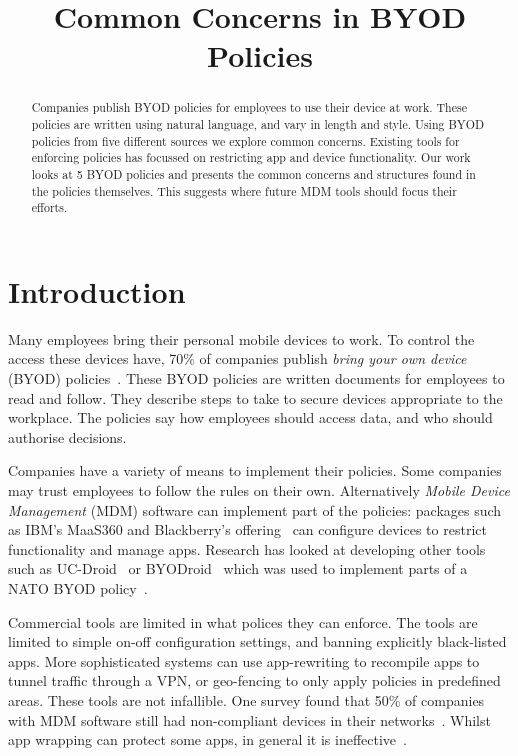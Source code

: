 \documentclass[conference,twocolumn]{IEEEtran}
\title{Common Concerns in BYOD Policies}
\author{%
  \IEEEauthorblockN{Joseph Hallett}
  \IEEEauthorblockA{University of Edinburgh}
  \and
  \IEEEauthorblockN{David Aspinall}
  \IEEEauthorblockA{University of Edinburgh}
}
\begin{document}
\maketitle

\begin{abstract}
  Companies publish BYOD policies for employees to use their device at work.
  These policies are written using natural language, and vary in length and style.
  Using BYOD policies from five different sources we explore common concerns.
  Existing tools for enforcing policies has focussed on restricting app and device functionality.
  Our work looks at 5 BYOD policies and presents the common concerns and structures found in the policies themselves.
  This suggests where future MDM tools should focus their efforts.
\end{abstract}

\section{Introduction}
\label{sec:introduction}

Many employees bring their personal mobile devices to work.
To control the access these devices have, 70\% of companies publish \emph{bring your own device} (BYOD) policies~\cite{schulze_byod_2016}.
These BYOD policies are written documents for employees to read and follow.
They describe steps to take to secure devices appropriate to the workplace.
The policies say how employees should access data, and who should authorise decisions.

Companies have a variety of means to implement their policies.
Some companies may trust employees to follow the rules on their own.
Alternatively \emph{Mobile Device Management} (MDM) software can implement part of the policies: packages such as IBM's MaaS360 and Blackberry's offering~\cite{_ibm_????,_secure_????} can configure devices to restrict functionality and manage apps.
Research has looked at developing other tools such as UC-Droid~\cite{martinelli_enhancing_2016} or BYODroid~\cite{armando_enabling_2014} which was used to implement parts of a NATO BYOD policy~\cite{armando_developing_2016}.

Commercial tools are limited in what polices they can enforce.
The tools are limited to simple on-off configuration settings, and banning explicitly black-listed apps.
More sophisticated systems can use app-rewriting to recompile apps to tunnel traffic through a VPN, or geo-fencing to only apply policies in predefined areas.
These tools are not infallible.
One survey found that 50\% of companies with MDM software still had non-compliant devices in their networks~\cite{mobileiron_security_labs_q4_2015}.
Whilst app wrapping can protect some apps, in general it is ineffective~\cite{hao_effectiveness_2013}.
\end{document}
